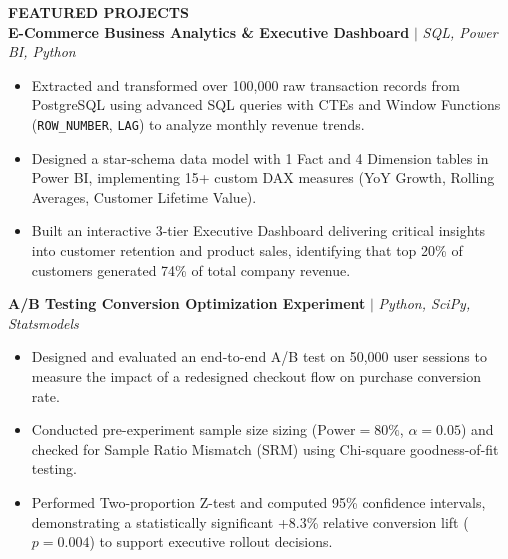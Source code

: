\begin{samplecvbox}
\textbf{\large FEATURED PROJECTS}\\
\textbf{E-Commerce Business Analytics \& Executive Dashboard} $|$ \textit{SQL, Power BI, Python}
\begin{itemize}[leftmargin=12pt, nosep]
    \item Extracted and transformed over 100,000 raw transaction records from PostgreSQL using advanced SQL queries with CTEs and Window Functions (\texttt{ROW\_NUMBER}, \texttt{LAG}) to analyze monthly revenue trends.
    \item Designed a star-schema data model with 1 Fact and 4 Dimension tables in Power BI, implementing 15+ custom DAX measures (YoY Growth, Rolling Averages, Customer Lifetime Value).
    \item Built an interactive 3-tier Executive Dashboard delivering critical insights into customer retention and product sales, identifying that top 20\% of customers generated 74\% of total company revenue.
\end{itemize}\vspace{4pt}

\textbf{A/B Testing Conversion Optimization Experiment} $|$ \textit{Python, SciPy, Statsmodels}
\begin{itemize}[leftmargin=12pt, nosep]
    \item Designed and evaluated an end-to-end A/B test on 50,000 user sessions to measure the impact of a redesigned checkout flow on purchase conversion rate.
    \item Conducted pre-experiment sample size sizing ($\text{Power} = 80\%$, $\alpha = 0.05$) and checked for Sample Ratio Mismatch (SRM) using Chi-square goodness-of-fit testing.
    \item Performed Two-proportion Z-test and computed 95\% confidence intervals, demonstrating a statistically significant +8.3\% relative conversion lift ($p = 0.004$) to support executive rollout decisions.
\end{itemize}
\end{samplecvbox}

